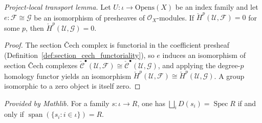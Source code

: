 \begin{lemma}\leanok
  \label{lem:cechCohomology_isZero_of_iso}
  \textit{Project-local transport lemma.}
  Let \(U : \iota \to \mathrm{Opens}(X)\) be an index family and let \(e : \mathcal{F} \cong
  \mathcal{G}\) be an isomorphism of presheaves of \(\mathcal{O}_X\)-modules. If
  \(\check{H}^p(\mathcal{U}, \mathcal{F}) = 0\) for some \(p\), then
  \(\check{H}^p(\mathcal{U}, \mathcal{G}) = 0\).
\end{lemma}
\begin{proof}
  \leanok
  The section {\v C}ech complex is functorial in the coefficient presheaf
  (Definition~\ref{def:section_cech_functoriality}), so \(e\) induces an isomorphism of section
  {\v C}ech complexes \(\check{\mathcal{C}}^\bullet(\mathcal{U}, \mathcal{F}) \cong
  \check{\mathcal{C}}^\bullet(\mathcal{U}, \mathcal{G})\), and applying the degree-\(p\) homology
  functor yields an isomorphism \(\check{H}^p(\mathcal{U}, \mathcal{F}) \cong
  \check{H}^p(\mathcal{U}, \mathcal{G})\). A group isomorphic to a zero object is itself zero.
\end{proof}

\begin{lemma}
  \label{lem:iSup_basicOpen_eq_top_iff_span}
  \mathlibok
  \textit{Provided by Mathlib.}
  For a family \(s : \iota \to R\), one has \(\bigsqcup_i D(s_i) = \operatorname{Spec} R\) if and only
  if \(\operatorname{span}(\{s_i : i \in \iota\}) = R\).
\end{lemma}

